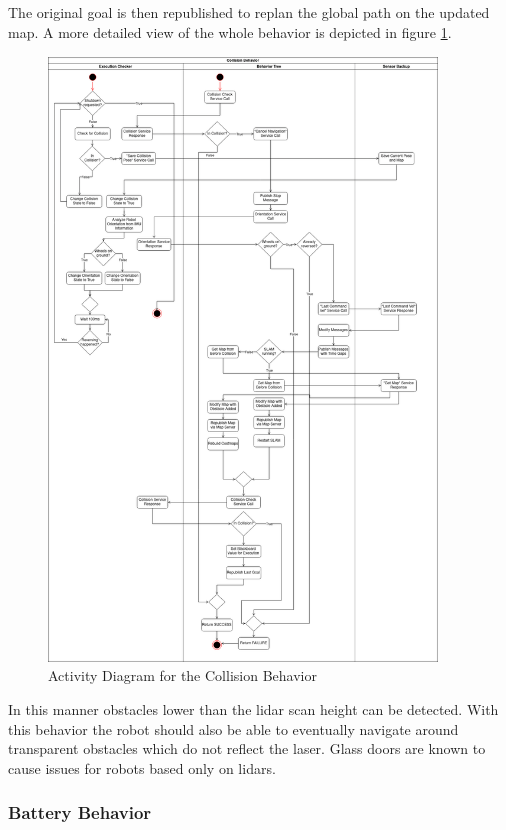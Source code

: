 \subparagraph*{}
The original goal is then republished to replan the global path on the updated map. A more detailed view of the whole behavior is depicted in figure \ref{fig:activity_diagram_collision}.

\begin{figure}[ht]
	\label{fig:activity_diagram_collision}
	\includegraphics[width=0.92\textwidth]{images/activity_diagram_collision.png}
	\caption{Activity Diagram for the Collision Behavior}
\end{figure}

In this manner obstacles lower than the lidar scan height can be detected. With this behavior the robot should also be able to eventually navigate around transparent obstacles which do not reflect the laser. Glass doors are known to cause issues for robots based only on lidars. 

\subsubsection{Battery Behavior}

